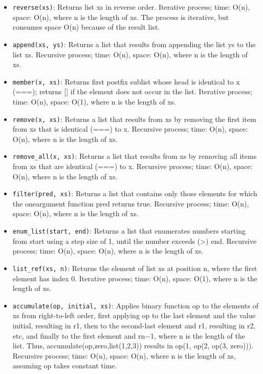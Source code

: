 \documentclass[a4paper]{article} \usepackage[backend=biber, style=numeric, sorting=none]{biblatex}
\begin{document}
\begin{multicols*}{4}
\begin{itemize}
\item \texttt{reverse(xs)}: Returns list xs in reverse order. Iterative process; time: O(n), space: O(n), where n is the length of xs. The process is iterative, but consumes space O(n) because of the result list.
\item \texttt{append(xs, ys)}: Returns a list that results from appending the list ys to the list xs. Recursive process; time: O(n), space: O(n), where n is the length of xs.
\item \texttt{member(x, xs)}: Returns first postfix sublist whose head is identical to x (===); returns [] if the element does not occur in the list. Iterative process; time: O(n), space: O(1), where n is the length of xs.
\item \texttt{remove(x, xs)}: Returns a list that results from xs by removing the first item from xs that is identical (===) to x. Recursive process; time: O(n), space: O(n), where n is the length of xs.
\item \texttt{remove\_all(x, xs)}: Returns a list that results from xs by removing all items from xs that are identical (===) to x. Recursive process; time: O(n), space: O(n), where n is the length of xs.
\item \texttt{filter(pred, xs)}: Returns a list that contains only those elements for which the oneargument function pred returns true. Recursive process; time: O(n), space: O(n), where n is the length of xs.
\item \texttt{enum\_list(start, end)}: Returns a list that enumerates numbers starting from start using a step size of 1, until the number exceeds (>) end. Recursive process; time: O(n), space: O(n), where n is the length of xs.
\item \texttt{list\_ref(xs, n)}: Returns the element of list xs at position n, where the first element has index 0. Iterative process; time: O(n), space: O(1), where n is the length of xs.
\item \texttt{accumulate(op, initial, xs)}: Applies binary function op to the elements of xs from right-to-left order, first applying op to the last element and the value initial, resulting in r1, then to the second-last element and r1, resulting in r2, etc, and finally to the first element and rn−1, where n is the length of the list. Thus, accumulate(op,zero,list(1,2,3)) results in op(1, op(2, op(3, zero))). Recursive process; time: O(n), space: O(n), where n is the length of xs, assuming op takes constant time.
\end{itemize}


\end{multicols*}
\end{document}
